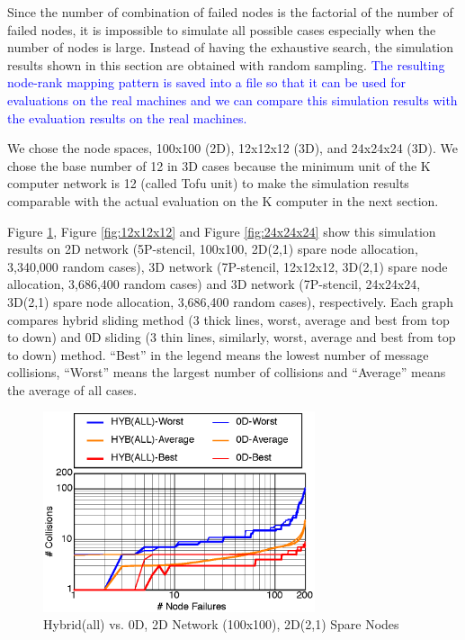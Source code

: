 \documentclass[Afour,times,sagev]{sagej}
\newcommand{\AH}[1]{%
  \textcolor{blue}{#1}}%
\begin{document}
Since the number of combination of failed nodes is the factorial of
the number of failed nodes, it is impossible to simulate all possible
cases especially when the number of nodes is large. Instead of having
the exhaustive search, the simulation results shown in this section
are obtained with random sampling. \AH{The resulting node-rank mapping
pattern is saved into a file so that it can be used for evaluations on
the real machines and we can compare this simulation results with the
evaluation results on the real machines.}

We chose the node spaces, 100x100 (2D), 12x12x12 (3D), and 24x24x24
(3D). We chose the base number of 12 in 3D cases  because the minimum
unit of the K computer network is 12 (called Tofu unit) to make the
simulation results comparable with the actual evaluation on the K
computer in the next section.

Figure \ref{fig:100x100}, Figure \ref{fig:12x12x12} and
Figure \ref{fig:24x24x24} show this simulation results on 2D network
(5P-stencil, 100x100, 2D(2,1) spare node allocation, 3,340,000 random
cases), 3D network (7P-stencil, 12x12x12, 3D(2,1) spare node
allocation, 3,686,400 random cases) and 3D network (7P-stencil,
24x24x24, 3D(2,1) spare node allocation, 3,686,400 random cases),
respectively. Each graph compares hybrid sliding method (3 thick
lines, worst, average and best from top to down) and 0D 
sliding (3 thin lines, similarly, worst, average and best
from top to down) method. ``Best'' in the legend means the lowest
number of message collisions, ``Worst'' means the largest number of
collisions and ``Average'' means the average of all cases. 

\begin{figure}[ht]
\centering
\includegraphics[width=80mm]{Figs/100x100-CL.eps}
  \caption{Hybrid(all) vs. 0D, 2D Network (100x100), 2D(2,1) Spare Nodes}
  \label{fig:100x100}
\end{figure}
\end{document}
